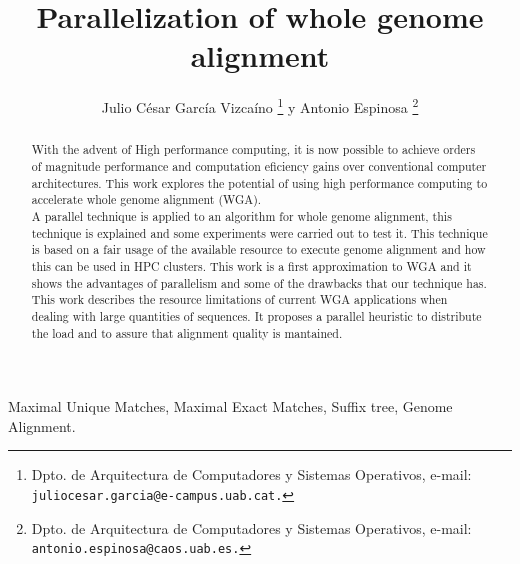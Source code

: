 \documentclass[twocolumn,twoside]{Jornadas}
\begin{document}
\title{Parallelization of whole genome alignment}
\author{%
     Julio C\'esar Garc\'ia Vizca\'ino%
     \thanks{Dpto. de Arquitectura de Computadores y Sistemas Operativos, e-mail: {\tt juliocesar.garcia@e-campus.uab.cat.}}
     y Antonio Espinosa%
     \thanks{Dpto. de Arquitectura de Computadores y Sistemas Operativos, e-mail: {\tt antonio.espinosa@caos.uab.es.}}
}

\maketitle
\markboth{}{}
\pagestyle{empty} 
\thispagestyle{empty} %

\begin{abstract} 
  With the advent of High performance computing,  it is now possible to achieve orders of magnitude performance and computation eficiency gains over conventional computer architectures. This work explores the potential of using high performance computing to accelerate whole genome alignment (WGA).\\
  A parallel technique is applied to an algorithm for whole genome alignment, this technique is explained and some experiments were carried out to test it. This technique is based on a fair usage of the available resource to execute genome alignment and how this can be used in HPC clusters. This work is a first approximation to WGA and it shows the advantages of parallelism and some of the drawbacks that our technique has.\\
  This work describes the resource limitations of current WGA applications when dealing with large quantities of sequences. It proposes a parallel heuristic to distribute the load and to assure that alignment quality is mantained.
\end{abstract}

\begin{keywords}
Maximal Unique Matches, Maximal Exact Matches, Suffix tree, Genome Alignment.
\end{keywords}
\end{document}
